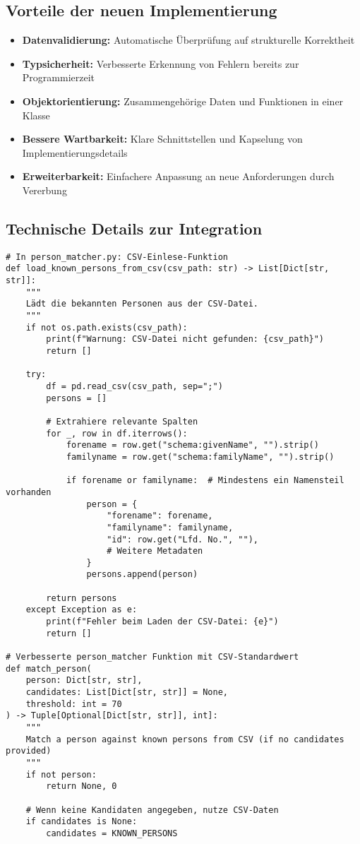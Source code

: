 \documentclass{article}
\begin{document}
\subsection*{Vorteile der neuen Implementierung}
\begin{itemize}
    \item \textbf{Datenvalidierung:} Automatische Überprüfung auf strukturelle Korrektheit
    \item \textbf{Typsicherheit:} Verbesserte Erkennung von Fehlern bereits zur Programmierzeit
    \item \textbf{Objektorientierung:} Zusammengehörige Daten und Funktionen in einer Klasse
    \item \textbf{Bessere Wartbarkeit:} Klare Schnittstellen und Kapselung von Implementierungsdetails
    \item \textbf{Erweiterbarkeit:} Einfachere Anpassung an neue Anforderungen durch Vererbung
\end{itemize}

\subsection*{Technische Details zur Integration}

\begin{verbatim}
# In person_matcher.py: CSV-Einlese-Funktion
def load_known_persons_from_csv(csv_path: str) -> List[Dict[str, str]]:
    """
    Lädt die bekannten Personen aus der CSV-Datei.
    """
    if not os.path.exists(csv_path):
        print(f"Warnung: CSV-Datei nicht gefunden: {csv_path}")
        return []
    
    try:
        df = pd.read_csv(csv_path, sep=";")
        persons = []
        
        # Extrahiere relevante Spalten
        for _, row in df.iterrows():
            forename = row.get("schema:givenName", "").strip()
            familyname = row.get("schema:familyName", "").strip()
            
            if forename or familyname:  # Mindestens ein Namensteil vorhanden
                person = {
                    "forename": forename,
                    "familyname": familyname,
                    "id": row.get("Lfd. No.", ""),
                    # Weitere Metadaten
                }
                persons.append(person)
        
        return persons
    except Exception as e:
        print(f"Fehler beim Laden der CSV-Datei: {e}")
        return []

# Verbesserte person_matcher Funktion mit CSV-Standardwert
def match_person(
    person: Dict[str, str], 
    candidates: List[Dict[str, str]] = None, 
    threshold: int = 70
) -> Tuple[Optional[Dict[str, str]], int]:
    """
    Match a person against known persons from CSV (if no candidates provided)
    """
    if not person:
        return None, 0
        
    # Wenn keine Kandidaten angegeben, nutze CSV-Daten
    if candidates is None:
        candidates = KNOWN_PERSONS
\end{verbatim}
\end{document}
